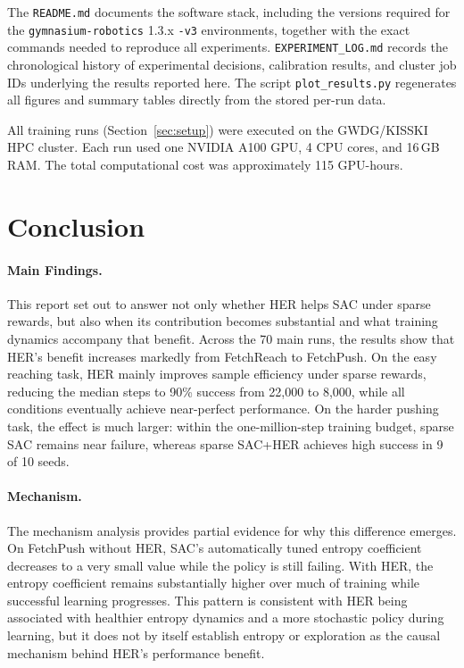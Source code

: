 \documentclass{article}
\begin{document}
The \texttt{README.md} documents the software stack, including the versions
required for the \texttt{gymnasium-robotics} 1.3.x \texttt{-v3} environments,
together with the exact commands needed to reproduce all experiments.
\texttt{EXPERIMENT\_LOG.md} records the chronological history of experimental
decisions, calibration results, and cluster job IDs underlying the results
reported here. The script \texttt{plot\_results.py} regenerates all figures and
summary tables directly from the stored per-run data.

All training runs (Section~\ref{sec:setup}) were executed on the GWDG/KISSKI
HPC cluster. Each run used one NVIDIA A100 GPU,
4 CPU cores, and 16\,GB RAM. The total computational cost was approximately
115 GPU-hours.

\section{Conclusion}
\label{sec:conclusion}

\paragraph{Main Findings.}
This report set out to answer not only whether HER helps SAC under sparse
rewards, but also when its contribution becomes substantial and what training
dynamics accompany that benefit. Across the 70 main runs, the results show
that HER's benefit increases markedly from FetchReach to FetchPush. On the
easy reaching task, HER mainly improves sample efficiency under sparse
rewards, reducing the median steps to 90\% success from 22,000 to 8,000,
while all conditions eventually achieve near-perfect performance. On the
harder pushing task, the effect is much larger: within the one-million-step
training budget, sparse SAC remains near failure, whereas sparse SAC+HER
achieves high success in 9 of 10 seeds.

\paragraph{Mechanism.}
The mechanism analysis provides partial evidence for why this difference
emerges. On FetchPush without HER, SAC's automatically tuned entropy
coefficient decreases to a very small value while the policy is still failing.
With HER, the entropy coefficient remains substantially higher over much of
training while successful learning progresses. This pattern is consistent with
HER being associated with healthier entropy dynamics and a more stochastic
policy during learning, but it does not by itself establish entropy or exploration
as the causal mechanism behind HER's performance benefit.
\end{document}
